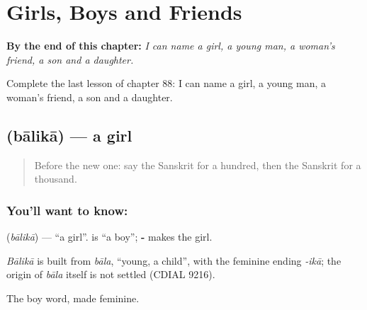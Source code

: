 
\chapter{Girls, Boys and Friends}
\label{ch:sa-girls-boys-friends}

\begin{chapteropening}
\textbf{By the end of this chapter:} \emph{I can name a girl, a young man, a woman's friend, a son and a daughter.}

Complete the last lesson of chapter 88: I can name a girl, a young man, a woman's friend, a son and a daughter.
\end{chapteropening}

\section[\texorpdfstring{\sk{बालिका} (bālikā)}{बालिका (bālikā)}]{ (bālikā) — a girl}

\label{lesson:SA-C88-girl}



\begin{quote}
Before the new one: say the Sanskrit for a hundred, then the Sanskrit for a thousand.
\end{quote}

\subsection*{You'll want to know: }
\textbf{} (\emph{bālikā}) — \textquotedblleft{}a girl\textquotedblright{}. \textbf{} is \textquotedblleft{}a boy\textquotedblright{}; \textbf{-} makes the girl.

\begin{cousinweb}
\emph{Bālikā} is built from \emph{bāla}, \textquotedblleft{}young, a child\textquotedblright{}, with the feminine ending \emph{-ikā}; the origin of \emph{bāla} itself is not settled (CDIAL 9216).
\end{cousinweb}

\begin{grammarlens}[title={What you've built}]
The boy word, made feminine.
\end{grammarlens}

